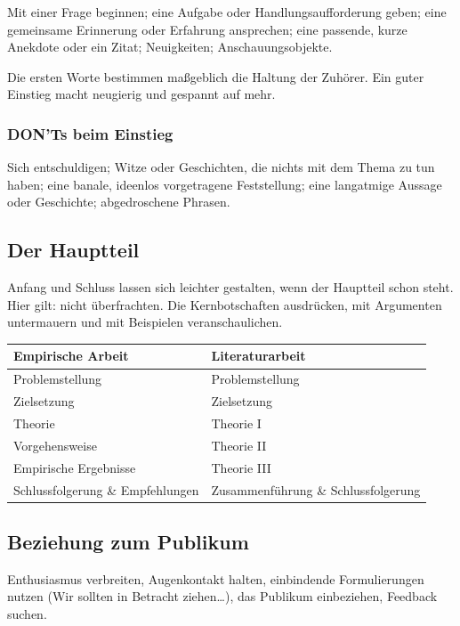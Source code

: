 \documentclass[12pt, a4paper]{article}
\begin{document}
Mit einer Frage beginnen; eine Aufgabe oder Handlungsaufforderung geben; eine
gemeinsame Erinnerung oder Erfahrung ansprechen; eine passende, kurze
Anekdote oder ein Zitat; Neuigkeiten; Anschauungsobjekte.

\begin{notebox}
Die ersten Worte bestimmen maßgeblich die Haltung der Zuhörer. Ein guter
Einstieg macht neugierig und gespannt auf mehr.
\end{notebox}

\subsubsection{DON'Ts beim Einstieg}

Sich entschuldigen; Witze oder Geschichten, die nichts mit dem Thema zu tun
haben; eine banale, ideenlos vorgetragene Feststellung; eine langatmige
Aussage oder Geschichte; abgedroschene Phrasen.

\subsection{Der Hauptteil}

Anfang und Schluss lassen sich leichter gestalten, wenn der Hauptteil schon
steht. Hier gilt: nicht überfrachten. Die Kernbotschaften ausdrücken, mit
Argumenten untermauern und mit Beispielen veranschaulichen.

\begin{center}
\begin{tabular}{ll}
\textbf{Empirische Arbeit} & \textbf{Literaturarbeit}\\\hline
Problemstellung & Problemstellung\\
Zielsetzung & Zielsetzung\\
Theorie & Theorie I\\
Vorgehensweise & Theorie II\\
Empirische Ergebnisse & Theorie III\\
Schlussfolgerung \& Empfehlungen & Zusammenführung \& Schlussfolgerung\\
\end{tabular}
\end{center}

\subsection{Beziehung zum Publikum}

Enthusiasmus verbreiten, Augenkontakt halten, einbindende Formulierungen
nutzen (\glqq Wir sollten in Betracht ziehen\ldots\grqq{}), das Publikum
einbeziehen, Feedback suchen.
\end{document}
